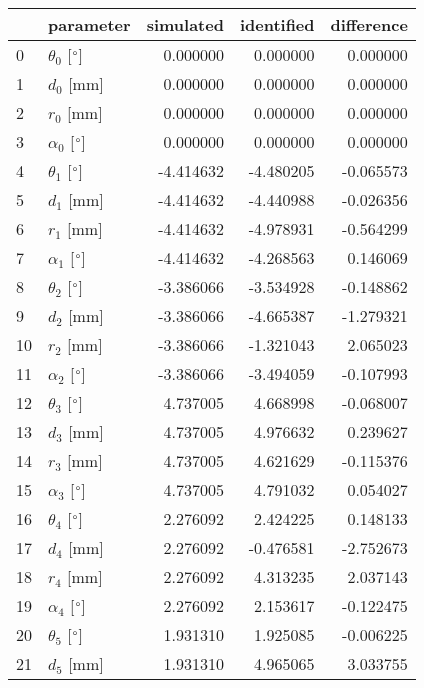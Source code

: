 \documentclass{standalone}%
\begin{document}
%
\normalsize%
\begin{tabular}{llrrr}
\toprule
{} &                 parameter & simulated & identified & difference \\
\midrule
0  &  $\theta_{0}$ [$\degree$] &  0.000000 &   0.000000 &   0.000000 \\
1  &              $d_{0}$ [mm] &  0.000000 &   0.000000 &   0.000000 \\
2  &              $r_{0}$ [mm] &  0.000000 &   0.000000 &   0.000000 \\
3  &  $\alpha_{0}$ [$\degree$] &  0.000000 &   0.000000 &   0.000000 \\
4  &  $\theta_{1}$ [$\degree$] & -4.414632 &  -4.480205 &  -0.065573 \\
5  &              $d_{1}$ [mm] & -4.414632 &  -4.440988 &  -0.026356 \\
6  &              $r_{1}$ [mm] & -4.414632 &  -4.978931 &  -0.564299 \\
7  &  $\alpha_{1}$ [$\degree$] & -4.414632 &  -4.268563 &   0.146069 \\
8  &  $\theta_{2}$ [$\degree$] & -3.386066 &  -3.534928 &  -0.148862 \\
9  &              $d_{2}$ [mm] & -3.386066 &  -4.665387 &  -1.279321 \\
10 &              $r_{2}$ [mm] & -3.386066 &  -1.321043 &   2.065023 \\
11 &  $\alpha_{2}$ [$\degree$] & -3.386066 &  -3.494059 &  -0.107993 \\
12 &  $\theta_{3}$ [$\degree$] &  4.737005 &   4.668998 &  -0.068007 \\
13 &              $d_{3}$ [mm] &  4.737005 &   4.976632 &   0.239627 \\
14 &              $r_{3}$ [mm] &  4.737005 &   4.621629 &  -0.115376 \\
15 &  $\alpha_{3}$ [$\degree$] &  4.737005 &   4.791032 &   0.054027 \\
16 &  $\theta_{4}$ [$\degree$] &  2.276092 &   2.424225 &   0.148133 \\
17 &              $d_{4}$ [mm] &  2.276092 &  -0.476581 &  -2.752673 \\
18 &              $r_{4}$ [mm] &  2.276092 &   4.313235 &   2.037143 \\
19 &  $\alpha_{4}$ [$\degree$] &  2.276092 &   2.153617 &  -0.122475 \\
20 &  $\theta_{5}$ [$\degree$] &  1.931310 &   1.925085 &  -0.006225 \\
21 &              $d_{5}$ [mm] &  1.931310 &   4.965065 &   3.033755 \\

\end{tabular}
\end{document}

